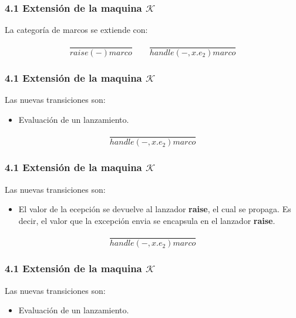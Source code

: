 \documentclass[xcolor=dvipsnames,table,spanish]{beamer}
\begin{document}
\begin{frame}
\frametitle{4.1 Extensión de la maquina $\mathcal{K}$}
La categoría de marcos se extiende con:

\begin{center}

      \begin{equation*}
         \frac{}{raise(-) marco}
         \qquad
           \frac{}{handle(-,x.e_2) marco}
	  \end{equation*}

  \end{center}
\end{frame}
\begin{frame}
\frametitle{4.1 Extensión de la maquina $\mathcal{K}$}
Las nuevas transiciones son:
\begin{itemize}
\item Evaluación de un lanzamiento.
\end{itemize}
\[ \frac{}{handle(-,x.e_2) marco}\]
\end{frame}
\begin{frame}
\frametitle{4.1 Extensión de la maquina $\mathcal{K}$}
Las nuevas transiciones son:
\begin{itemize}
\item El valor de la ecepción se devuelve al lanzador \textbf{raise}, el cual se propaga. Es decir, el valor que la excepción envia se encapsula en el lanzador \textbf{raise}.
\end{itemize}
\[ \frac{}{handle(-,x.e_2) marco}\]
\end{frame}
\begin{frame}
\frametitle{4.1 Extensión de la maquina $\mathcal{K}$}
Las nuevas transiciones son:
\begin{itemize}
\item Evaluación de un lanzamiento.
\end{itemize}

\end{frame}
\begin{frame}

\end{frame}
\begin{frame}

\end{frame}
\end{document}
